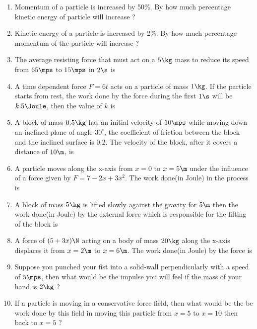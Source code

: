 \documentclass{article}
\def\ansit#1{\textcolor{red!95}{\quad}}
\begin{document}
\begin{enumerate}
\item Momentum of a particle is increased by 50\%. By how much percentage kinetic energy of particle
will increase ?
\ansit{125}

\item Kinetic energy of a particle is increased by 2\%. By how much percentage momentum of the particle will increase ? \ansit{1}

\item The average resisting force that must act on a $5 \kg$ mass to reduce its speed from $65\mps$ to $15 \mps$ in $2\s$ is \ansit{125}

\item A time dependent force $F = 6t$ acts on a particle of mass $1 \kg$. If the particle starts from rest, the work done by the force during the first $1 \s$ will be $k.5\Joule$, then the value of $k$ is \ansit{4}

\item A block of mass $0.5 \kg$ has an initial velocity of $10 \mps$ while moving down an inclined plane of angle $30^\circ$, the coefficient of friction between the block and the inclined surface is $0.2$. The velocity of the block, after it covers a distance of $10 \m$, is \ansit{13}

\item A particle moves along the x-axis from $x = 0$ to $x = 5 \m$ under the influence of a force given by $F = 7 - 2 x + 3 x^2$. The work done(in Joule) in the process is\ansit{135}


\item A block of mass $5\kg$ is lifted slowly against the gravity for $5\m$ then the work done(in Joule) by the external force which is responsible for the lifting of the block is \ansit{250}

\item A force of $(5+3x) \N$ acting on a body of mass $20 \kg$ along the x-axis displaces it from $x=2\m$ to $x=6\m$. The work done(in Joule) by the force is \ansit{68}

\item Suppose you punched your fist into a solid-wall perpendicularly with a speed of $5\mps$, then what would be the impulse you will feel if the mass of your hand is $2\kg$ ?\ansit{10}

\item If a particle is moving in a conservative force field, then what would be the be work done by this field in moving this particle from $x=5$ to $x=10$ then back to $x=5$ ?\ansit{0}


	
\end{enumerate}
\end{document}
